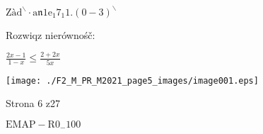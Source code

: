 \documentclass[a4paper,12pt]{article}
\begin{document}
$\mathrm{Z}\text{à} \mathrm{d}^{\backslash }\cdot \mathrm{a}\mathfrak{n}1\mathrm{e}_{1}7_{1}1. (0-3)^{\backslash }$

Rozwiqz nierównośč:

$\displaystyle \frac{2x-1}{1-x}\leq\frac{2+2x}{5x}$
\begin{center}
\texttt{[image: ./F2\_M\_PR\_M2021\_page5\_images/image001.eps]}
\end{center}
Strona 6 z27

$\mathrm{E}\mathrm{M}\mathrm{A}\mathrm{P}-\mathrm{R}0_{-}100$
\end{document}

